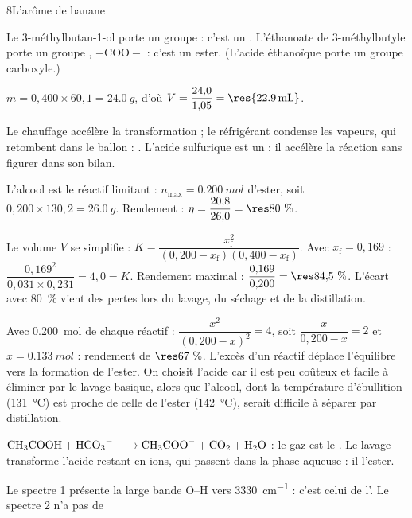 

\begin{corrigeBac}{8}{L'arôme de banane}
\begin{questions}
\item Le 3-méthylbutan-1-ol porte un groupe  : c'est un . L'éthanoate de 3-méthylbutyle porte un
groupe , $-\mathrm{COO}-$ : c'est un ester. (L'acide éthanoïque porte un groupe carboxyle.) 
\item $m=0{,}400\times60{,}1=\qty{24,0}{g}$, d'où $V=\dfrac{24{,}0}{1{,}05}=\res{\qty{22,9}{mL}}$. 
\item Le chauffage accélère la transformation ; le réfrigérant condense les vapeurs, qui retombent dans le ballon : . L'acide sulfurique est un  : il accélère la réaction sans figurer dans son
bilan. 
\item L'alcool est le réactif limitant : $n_\mathrm{max}=\qty{0,200}{mol}$ d'ester, soit $0{,}200\times130{,}2=\qty{26,0}{g}$. Rendement :
$\eta=\dfrac{20{,}8}{26{,}0}=\res{80~\%}$. 
\item Le volume $V$ se simplifie : $K=\dfrac{x_\mathrm{f}^2}{(0{,}200-x_\mathrm{f})(0{,}400-x_\mathrm{f})}$. Avec $x_\mathrm{f}=0{,}169$ :
$\dfrac{0{,}169^2}{0{,}031\times0{,}231}=4{,}0=K$. Rendement maximal : $\dfrac{0{,}169}{0{,}200}=\res{84{,}5~\%}$. L'écart avec 80~\% vient des
pertes lors du lavage, du séchage et de la distillation. 
\item Avec \qty{0,200}{mol} de chaque réactif : $\dfrac{x^2}{(0{,}200-x)^2}=4$, soit $\dfrac{x}{0{,}200-x}=2$ et $x=\qty{0,133}{mol}$ : rendement de
$\res{67~\%}$. L'excès d'un réactif déplace l'équilibre vers la formation de l'ester. On choisit l'acide car il est peu coûteux
et facile à éliminer par le lavage basique, alors que l'alcool, dont la température d'ébullition (\qty{131}{\degreeCelsius}) est proche
de celle de l'ester (\qty{142}{\degreeCelsius}), serait difficile à séparer par distillation. \pts{1 pt}
\item $\ce{CH3COOH + HCO3- -> CH3COO- + CO2 + H2O}$ : le gaz est le . Le lavage transforme l'acide
restant en ions, qui passent dans la phase aqueuse : il  l'ester. 
\item Le spectre 1 présente la large bande O--H vers \qty{3330}{cm^{-1}} : c'est celui de l'. Le spectre 2 n'a pas de

\end{questions}
\end{corrigeBac}

